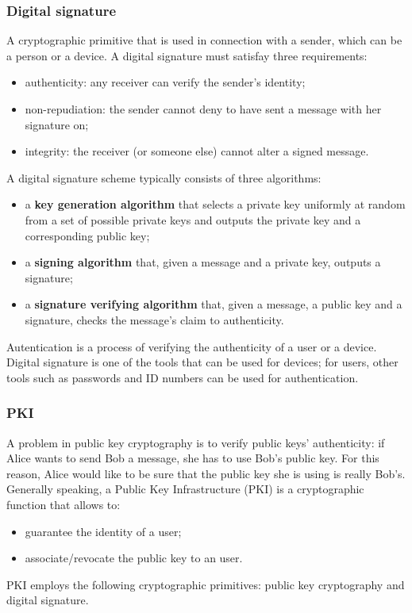\documentclass[a4paper, 10pt, titlepage]{article}
\begin{document}
\subsubsection*{Digital signature}
A cryptographic primitive that is used in connection with a sender, which can be a person or a device. A digital signature must satisfay three requirements:
\begin{itemize}
\item authenticity: any receiver can verify the sender's identity;
\item non-repudiation: the sender cannot deny to have sent a message with her signature on;
\item integrity: the receiver (or someone else) cannot alter a signed message.
\end{itemize}
A digital signature scheme typically consists of three algorithms:
\begin{itemize}
\item a \textbf{key generation algorithm} that selects a private key uniformly at random from a set of possible private keys and outputs the private key and a corresponding public key;
\item a \textbf{signing algorithm} that, given a message and a private key, outputs a signature;
\item a \textbf{signature verifying algorithm} that, given a message, a public key and a signature, checks the message's claim to authenticity.
\end{itemize}
Autentication is a process of verifying the authenticity of a user or a device. Digital signature is one of the tools that can be used for devices; for users, other tools such as passwords and ID numbers can be used for authentication.

\subsubsection{PKI}
A problem in public key cryptography is to verify public keys' authenticity: if Alice wants to send Bob a message, she has to use Bob's public key. For this reason, Alice would like to be sure that the public key she is using is really Bob's. Generally speaking, a Public Key Infrastructure (PKI) is a cryptographic function that allows to:
\begin{itemize}
\item guarantee the identity of a user;
\item associate/revocate the public key to an user.
\end{itemize}
PKI employs the following cryptographic primitives: public key cryptography and digital signature. 
\end{document}
